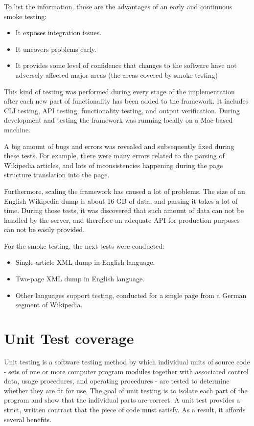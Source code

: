 \documentclass[thesis=M,english,hidelinks]{FITthesis}[2019/12/23]
\begin{document}
To list the information, those are the advantages of an early and continuous smoke testing:
\begin{itemize}
	\item It exposes integration issues.
	\item It uncovers problems early.
	\item It provides some level of confidence that changes to the software have not adversely affected major areas (the areas covered by smoke testing)
\end{itemize}

This kind of testing was performed during every stage of the implementation after each new part of functionality has been added to the framework. It includes \gls{CLI} testing, API testing, functionality testing, and output verification. During development and testing the framework was running locally on a Mac-based machine.

A big amount of bugs and errors was revealed and subsequently fixed during these tests. For example, there were many errors related to the parsing of Wikipedia articles, and lots of inconsistencies happening during the page structure translation into the page. 

Furthermore, scaling the framework has caused a lot of problems. The size of an English Wikipedia dump is about 16 GB of data, and parsing it takes a lot of time. During those tests, it was discovered that such amount of data can not be handled by the server, and therefore an adequate API for production purposes can not be easily provided.

For the smoke testing, the next tests were conducted:

\begin{itemize}
	\item Single-article XML dump in English language.
	\item Two-page XML dump in English language.
	\item Other languages support testing, conducted for a single page from a German segment of Wikipedia.
\end{itemize}




\section{Unit Test coverage}

Unit testing is a software testing method by which individual units of source code - sets of one or more computer program modules together with associated control data, usage procedures, and operating procedures - are tested to determine whether they are fit for use. The goal of unit testing is to isolate each part of the program and show that the individual parts are correct. A unit test provides a strict, written contract that the piece of code must satisfy. As a result, it affords several benefits.
\end{document}
